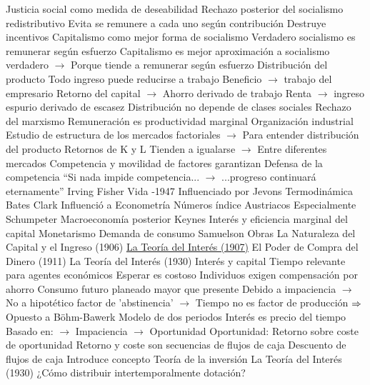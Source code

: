 \documentclass{nuevotema}
\begin{document}
\begin{esquemal}
				\4[] Justicia social como medida de deseabilidad
				\4 Rechazo posterior del socialismo redistributivo
				\4[] Evita se remunere a cada uno según contribución
				\4[] Destruye incentivos
				\4 Capitalismo como mejor forma de socialismo
				\4[] Verdadero socialismo es remunerar según esfuerzo
				\4[] Capitalismo es mejor aproximación a socialismo verdadero
				\4[] $\to$ Porque tiende a remunerar según esfuerzo
			\3 Distribución del producto
				\4 Todo ingreso puede reducirse a trabajo
				\4[] Beneficio $\to$ trabajo del empresario
				\4[] Retorno del capital $\to$ Ahorro derivado de trabajo
				\4[] Renta $\to$ ingreso espurio derivado de escasez
				\4 Distribución no depende de clases sociales
				\4[] Rechazo del marxismo
				\4 Remuneración es productividad marginal
			\3 Organización industrial
				\4 Estudio de estructura de los mercados factoriales
				\4[] $\to$ Para entender distribución del producto
				\4 Retornos de K y L
				\4[] Tienden a igualarse
				\4[] $\to$ Entre diferentes mercados
				\4[] Competencia y movilidad de factores garantizan
				\4 Defensa de la competencia
				\4[] ``Si nada impide competencia...
				\4[] $\to$ ...progreso continuará eternamente''
		\2 Irving Fisher
			\3 Vida
				-1947
			\3 Influenciado por
				\4 Jevons
				\4 Termodinámica
				\4 Bates Clark
			\3 Influenció a
				\4 Econometría
				\4 Números índice
				\4 Austriacos
				\4[] Especialmente Schumpeter
				\4 Macroeconomía posterior
				\4 Keynes
				\4[] Interés y eficiencia marginal del capital
				\4 Monetarismo
				\4 Demanda de consumo
				\4 Samuelson
			\3 Obras
				\4 La Naturaleza del Capital y el Ingreso (1906)
				\4 \underline{La Teoría del Interés (1907)}
				\4 El Poder de Compra del Dinero (1911)
				\4 La Teoría del Interés (1930)
			\3 Interés y capital
				\4 Tiempo relevante para agentes económicos
				\4 Esperar es costoso
				\4[] Individuos exigen compensación por ahorro
				\4[] Consumo futuro planeado mayor que presente
				\4[] Debido a impaciencia
				\4[] $\to$ No a hipotético factor de 'abstinencia'
				\4[] $\to$ Tiempo no es factor de producción
				\4[] $\Rightarrow$ Opuesto a Böhm-Bawerk
				\4 Modelo de dos periodos
				\4 Interés es precio del tiempo
				\4 Basado en:
				\4[] $\to$ Impaciencia
				\4[] $\to$ Oportunidad
				\4 Oportunidad:
				\4[] Retorno sobre coste de oportunidad
				\4[] Retorno y coste son secuencias de flujos de caja
				\4 Descuento de flujos de caja
				\4[] Introduce concepto
			\3 Teoría de la inversión
				\4 La Teoría del Interés (1930)
				\4 ¿Cómo distribuir intertemporalmente dotación?

\end{esquemal}
\end{document}
